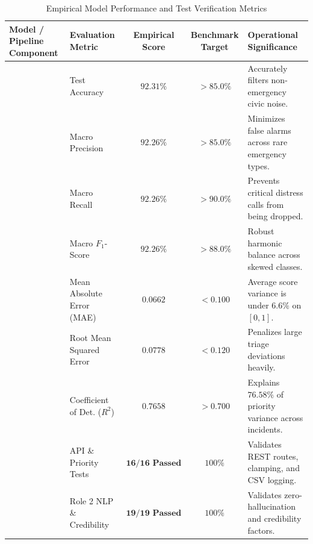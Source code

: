 \documentclass[10pt,a4paper]{article}
\begin{document}
\begin{table}[htbp]
  \centering
  \small
  \caption{Empirical Model Performance and Test Verification Metrics}
  \label{tab:evaluation_metrics}
  \begin{tabularx}{\textwidth}{llccX}
    \toprule
    \textbf{Model / Pipeline Component} & \textbf{Evaluation Metric} & \textbf{Empirical Score} & \textbf{Benchmark Target} & \textbf{Operational Significance} \\
    \midrule
    & Test Accuracy & $\mathbf{92.31\%}$ & $> 85.0\%$ & Accurately filters non-emergency civic noise. \\
    & Macro Precision & $\mathbf{92.26\%}$ & $> 85.0\%$ & Minimizes false alarms across rare emergency types. \\
    & Macro Recall & $\mathbf{92.26\%}$ & $> 90.0\%$ & Prevents critical distress calls from being dropped. \\
    & Macro $F_1$-Score & $\mathbf{92.26\%}$ & $> 88.0\%$ & Robust harmonic balance across skewed classes. \\
    \midrule
    & Mean Absolute Error (MAE) & $\mathbf{0.0662}$ & $< 0.100$ & Average score variance is under $6.6\%$ on $[0, 1]$. \\
    & Root Mean Squared Error & $\mathbf{0.0778}$ & $< 0.120$ & Penalizes large triage deviations heavily. \\
    & Coefficient of Det. ($R^2$) & $\mathbf{0.7658}$ & $> 0.700$ & Explains $76.58\%$ of priority variance across incidents. \\
    \midrule
    & API \& Priority Tests & $\mathbf{16 / 16 \text{ Passed}}$ & $100\%$ & Validates REST routes, clamping, and CSV logging. \\
    & Role 2 NLP \& Credibility & $\mathbf{19 / 19 \text{ Passed}}$ & $100\%$ & Validates zero-hallucination and credibility factors. \\
    \bottomrule
  \end{tabularx}
\end{table}
\end{document}
